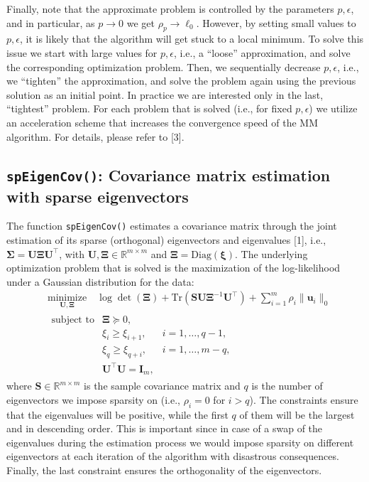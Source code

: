 \documentclass[]{article}
\begin{document}
Finally, note that the approximate problem is controlled by the
parameters \(p, \epsilon\), and in particular, as \(p\rightarrow0\) we
get \(\rho_p\rightarrow\ell_0\). However, by setting small values to
\(p, \epsilon\), it is likely that the algorithm will get stuck to a
local minimum. To solve this issue we start with large values for
\(p, \epsilon\), i.e., a ``loose'' approximation, and solve the
corresponding optimization problem. Then, we sequentially decrease
\(p, \epsilon\), i.e., we ``tighten'' the approximation, and solve the
problem again using the previous solution as an initial point. In
practice we are interested only in the last, ``tightest'' problem. For
each problem that is solved (i.e., for fixed \(p, \epsilon\)) we utilize
an acceleration scheme that increases the convergence speed of the MM
algorithm. For details, please refer to {[}3{]}.

\subsection{\texorpdfstring{\texttt{spEigenCov()}: Covariance matrix
estimation with sparse
eigenvectors}{spEigenCov(): Covariance matrix estimation with sparse eigenvectors}}\label{speigencov-covariance-matrix-estimation-with-sparse-eigenvectors}

The function \texttt{spEigenCov()} estimates a covariance matrix through
the joint estimation of its sparse (orthogonal) eigenvectors and
eigenvalues {[}1{]}, i.e.,
\(\mathbf{\Sigma}=\mathbf{U}\mathbf{\Xi}\mathbf{U}^\top\), with
\(\mathbf{U},\mathbf{\Xi}\in\mathbb{R}^{m\times m}\) and
\(\mathbf{\Xi}=\text{Diag}(\mathbf{\xi})\). The underlying optimization
problem that is solved is the maximization of the log-likelihood under a
Gaussian distribution for the data: \[\begin{aligned}
    &\underset{\mathbf{U},\mathbf{\Xi}}{\text{minimize}}\quad\log\det\left(\mathbf{\Xi}\right)+\text{Tr}\left(\mathbf{S}\mathbf{U}\mathbf{\Xi}^{-1}\mathbf{U}^\top\right) + \sum_{i=1}^{m}\rho_i\|\mathbf{u}_i\|_0\\
        &\!\begin{array}{lll}
        \text{subject to} & \mathbf{\Xi}\succcurlyeq0, &\\
         & \xi_{i}\geq \xi_{i+1}, & i=1,\dots, q-1,\\
         & \xi_{q}\geq \xi_{q+i}, & i=1,\dots,m-q,\\
         & \mathbf{U}^\top\mathbf{U}=\mathbf{I}_m,
        \end{array}
    \end{aligned}\] where \(\mathbf{S}\in\mathbb{R}^{m\times m}\) is the
sample covariance matrix and \(q\) is the number of eigenvectors we
impose sparsity on (i.e., \(\rho_i = 0\) for \(i>q\)). The constraints
ensure that the eigenvalues will be positive, while the first \(q\) of
them will be the largest and in descending order. This is important
since in case of a swap of the eigenvalues during the estimation process
we would impose sparsity on different eigenvectors at each iteration of
the algorithm with disastrous consequences. Finally, the last constraint
ensures the orthogonality of the eigenvectors.
\end{document}
